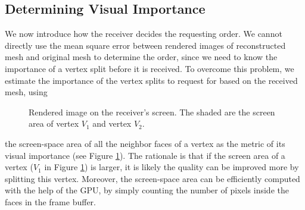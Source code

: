      \subsection{Determining Visual Importance}
     \label{ss:dstream:visual}
     We now introduce how the receiver decides the requesting order. 
     We cannot directly use the mean square error between rendered images of 
     reconstructed mesh and original mesh to determine the order, 
     since we need to know the importance of a vertex 
     split before it is received. To overcome this problem, we estimate
     the importance of the vertex splits to request for based on the received
     mesh, using
    \begin{figure}
    \centering
    \caption{%
    Rendered image on the receiver's screen. 
    The shaded are the screen area of vertex $V_1$ and vertex $V_2$.
    \label{dstream:screen_area}}
    \end{figure}
     the screen-space area of all the neighbor faces of a vertex as the 
     metric of its visual importance (see Figure \ref{dstream:screen_area}).
     The rationale is that if the screen area of a vertex ($V_1$ in Figure \ref{dstream:screen_area}) 
    is larger, it is likely the quality can
    be improved more by splitting this vertex. 
    Moreover, the screen-space area can be efficiently
    computed with the help of the GPU, by simply counting the
	number of pixels inside the faces in the frame buffer.
    
